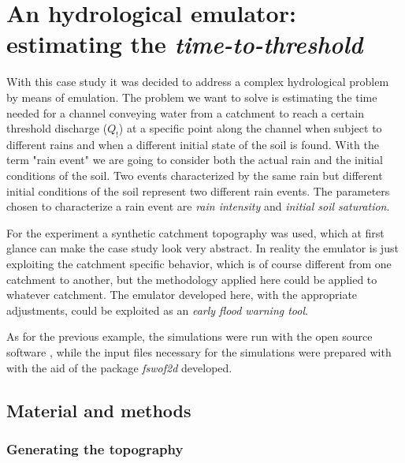 \section{An hydrological emulator: estimating the \textit{time-to-threshold}}

With this case study it was decided to address a complex hydrological problem by means of emulation.
The problem we want to solve is estimating the time needed for a channel conveying water from a catchment to reach a certain threshold discharge ($Q_!$) at a specific point along the channel when subject to different rains and when a different initial state of the soil is found.
With the term "rain event" we are going to consider both the actual rain and the initial conditions of the soil.
Two events characterized by the same rain but different initial conditions  of the soil represent two different rain events. The parameters chosen to characterize a rain event are \emph{rain intensity} and \emph{initial soil saturation}.

For the experiment a synthetic catchment topography was used, which at first glance can make the case study look very abstract.
In reality the emulator is just exploiting the catchment specific behavior, which is of course different from one catchment to another, but the methodology applied here could be applied to whatever catchment.
The emulator developed here, with the appropriate adjustments, could be exploited as an \emph{early flood warning tool}.

As for the previous example, the simulations were run with the open source software , while the input files necessary for the simulations were prepared with  with the aid of the package \textit{fswof2d} developed.


\subsection{Material and methods}
\subsubsection{Generating the topography}

